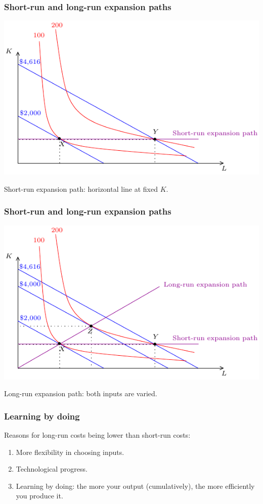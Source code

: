 \documentclass[xcolor=pdftex,dvipsnames]{beamer}
\begin{document}
\begin{frame}
\frametitle{Short-run and long-run expansion paths}
\begin{center}
\includegraphics{pics/SRLRExpansionA}
 \end{center}
 Short-run expansion path: horizontal line at fixed $K$.
\end{frame}


\begin{frame}
\frametitle{Short-run and long-run expansion paths}
\begin{center}
\includegraphics{pics/SRLRExpansion}
 \end{center}

Long-run expansion path: both inputs are varied.
\end{frame}




\begin{frame}
\frametitle{Learning by doing}
Reasons for long-run costs being lower than short-run costs:
\begin{enumerate}[<+->]
\item More flexibility in choosing inputs.
\item Technological progress.
\item Learning by doing: the more your output (cumulatively), the more efficiently
  you produce it.
\end{enumerate}

\end{frame}
\end{document}

